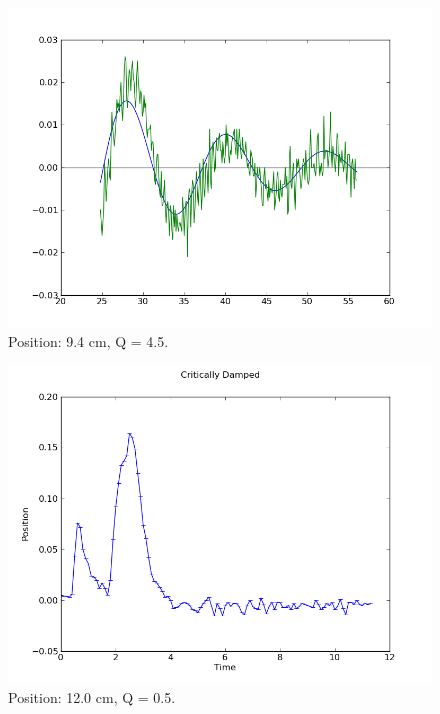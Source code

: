 \documentclass[12pt]{article}
\begin{document}
\begin{figure}[H]
\centering
\hspace{-0.0in}\includegraphics[scale=0.60]{SeisPosition5.png}
\caption{Position: 9.4 cm, Q = 4.5. \label{fig:setup}}
\end{figure}

\begin{figure}[H]
\centering
\hspace{-0.0in}\includegraphics[scale=0.60]{SeisPosition6.png}
\caption{Position: 12.0 cm, Q = 0.5. \label{fig:setup}}
\end{figure}
\end{document}
